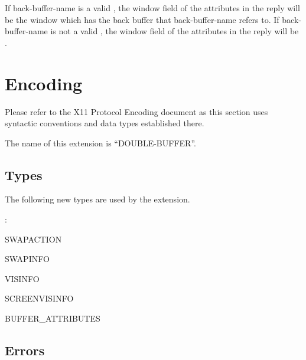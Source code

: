 If back-buffer-name is a valid , the
window field of the attributes in the reply will
be the window which has the back buffer that
back-buffer-name refers to.  If back-buffer-name
is not a valid , the window field of
the attributes in the reply will be .

\section{Encoding}

Please refer to the X11 Protocol Encoding document as this section uses
syntactic conventions and data types established there.

The name of this extension is ``DOUBLE-BUFFER''.

\subsection{Types}

The following new types are used by the extension.

: 
\vspace{5mm}

\begin{etypedef}{SWAPACTION}
\end{etypedef}

\begin{etypedef}{SWAPINFO}
\end{etypedef}

\begin{etypedef}{VISINFO}
\end{etypedef}

\begin{etypedef}{SCREENVISINFO}
\end{etypedef}

\begin{etypedef}{BUFFER\_ATTRIBUTES}
\end{etypedef}

\subsection{Errors}

